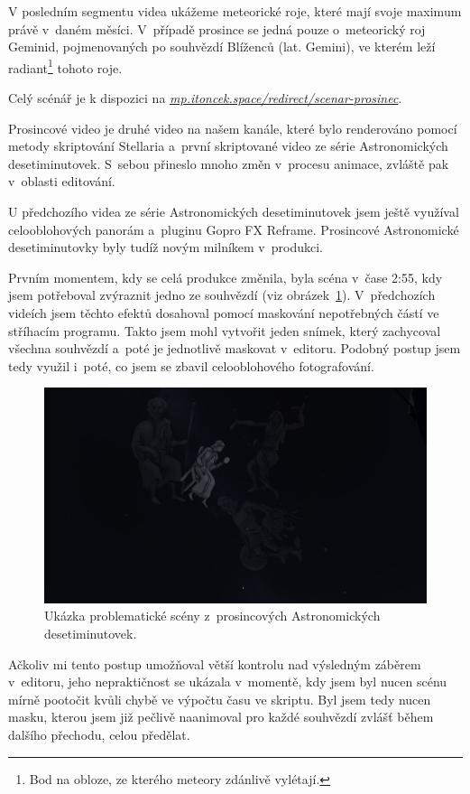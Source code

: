 \documentclass[12pt,a4paper,titlepage]{article}
\newcommand{\link}[2]{\href{#1}{\textcolor{link-color}{\textit{#2}}}}%
\begin{document}
V posledním segmentu videa ukážeme meteorické roje, které mají svoje maximum právě v~daném měsíci. V~případě prosince se jedná pouze o~meteorický roj Geminid, pojmenovaných po souhvězdí Blíženců (lat. Gemini), ve kterém leží radiant\footnote{Bod na obloze, ze kterého meteory zdánlivě vylétají.} tohoto roje.

Celý scénář je k dispozici na \link{https://mp.itoncek.space/redirect/scenar-prosinec}{mp.itoncek.space/redirect/scenar-prosinec}.

Prosincové video je druhé video na našem kanále, které bylo renderováno pomocí metody skriptování Stellaria a~první skriptované video ze série Astronomických desetiminutovek. S~sebou přineslo mnoho změn v~procesu animace, zvláště pak v~oblasti editování. 

U předchozího videa ze série Astronomických desetiminutovek jsem ještě využíval celooblohových panorám a~pluginu Gopro FX Reframe. Prosincové Astronomické desetiminutovky byly tudíž novým milníkem v~produkci.

Prvním momentem, kdy se celá produkce změnila, byla scéna v~čase 2:55, kdy jsem potřeboval zvýraznit jedno ze souhvězdí (viz obrázek~\ref{prac:ac12_1}). V~předchozích videích jsem těchto efektů dosahoval pomocí maskování nepotřebných částí ve stříhacím programu. Takto jsem mohl vytvořit jeden snímek, který zachycoval všechna souhvězdí a~poté je jednotlivě maskovat v~editoru. Podobný postup jsem tedy využil i~poté, co jsem se zbavil celooblohového fotografování.

\begin{figure}[H]
	\centering
	\includegraphics[width=.95\textwidth]{ac12_1.png}
	\caption{Ukázka problematické scény z~prosincových Astronomických desetiminutovek.}\label{prac:ac12_1}
\end{figure}

Ačkoliv mi tento postup umožňoval větší kontrolu nad výsledným záběrem v~editoru, jeho nepraktičnost se ukázala v~momentě, kdy jsem byl nucen scénu mírně pootočit kvůli chybě ve výpočtu času ve skriptu. Byl jsem tedy nucen masku, kterou jsem již pečlivě naanimoval pro každé souhvězdí zvlášť během dalšího přechodu, celou předělat.
\end{document}
